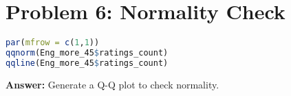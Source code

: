 \documentclass[12pt]{article}
\begin{document}
\section*{Problem 6: Normality Check}
\begin{lstlisting}[language=R]
par(mfrow = c(1,1))
qqnorm(Eng_more_45$ratings_count)
qqline(Eng_more_45$ratings_count)
\end{lstlisting}
\textbf{Answer:} Generate a Q-Q plot to check normality.
\end{document}
